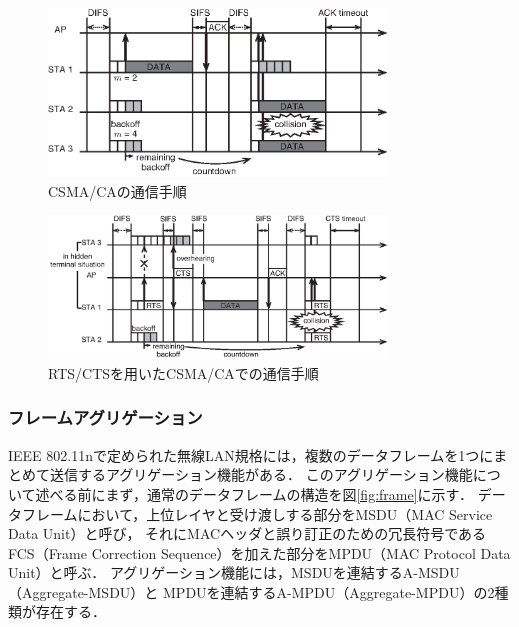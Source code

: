\documentclass[master]{kuisthesis}		%
\begin{document}
			\begin{figure}[t]
				\begin{center}
					\includegraphics[width=0.8\textwidth]{fig/csmaca.eps}
					\caption{CSMA/CAの通信手順}
					\label{fig:csmaca}
				\end{center}
			\end{figure}
			\begin{figure}[t]
				\begin{center}
					\includegraphics[width=0.8\textwidth]{fig/rtscts2.eps}
					\caption{RTS/CTSを用いたCSMA/CAでの通信手順}
					\label{fig:rtscts}
				\end{center}
			\end{figure}

		\subsubsection{フレームアグリゲーション}
			{IEEE} 802.11nで定められた無線LAN規格には，複数のデータフレームを1つにまとめて送信するアグリゲーション機能がある\cite{stdn}．
			このアグリゲーション機能について述べる前にまず，通常のデータフレームの構造を図\ref{fig:frame}に示す．
			データフレームにおいて，上位レイヤと受け渡しする部分をMSDU（MAC Service Data Unit）と呼び，
			それにMACヘッダと誤り訂正のための冗長符号であるFCS（Frame Correction Sequence）を加えた部分をMPDU（MAC Protocol Data Unit）と呼ぶ．
			アグリゲーション機能には，MSDUを連結するA-MSDU（Aggregate-MSDU）と
			MPDUを連結するA-MPDU（Aggregate-MPDU）の2種類が存在する．
\end{document}

